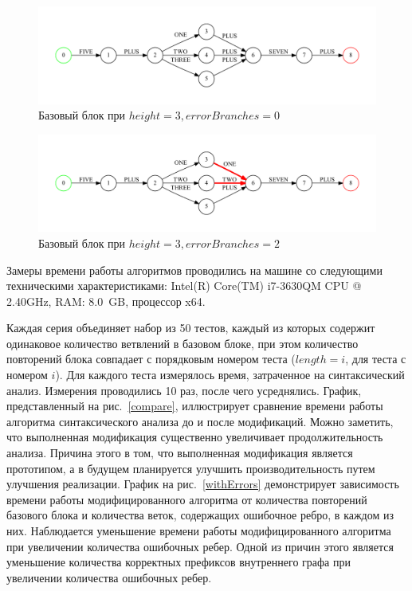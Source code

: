 \begin{figure}[h!]
 \centering
 \includegraphics[width=15cm]{pictures/block.pdf}
 \caption{Базовый блок при $height=3, errorBranches=0$}
 \label{block}
\end{figure}

\begin{figure}[h!]
 \centering
 \includegraphics[width=15cm]{pictures/errorBlock.pdf}
 \caption{Базовый блок при $height=3, errorBranches=2$}
 \label{errorBlock}
\end{figure}

Замеры времени работы алгоритмов проводились на машине со следующими техническими характеристиками: Intel(R) Core(TM) i7-3630QM CPU @ 2.40GHz, RAM: 8.0~GB, процессор x64.

Каждая серия объединяет набор из 50 тестов, каждый из которых содержит одинаковое количество ветвлений в базовом блоке, при этом количество повторений блока совпадает с порядковым номером теста ($length = i$, для теста с номером $i$). Для каждого теста измерялось время, затраченное на синтаксический анализ. Измерения проводились 10 раз, после чего усреднялись. График, представленный на рис.~\ref{compare}, иллюстрирует сравнение времени работы алгоритма синтаксического анализа до и после модификаций. Можно заметить, что выполненная модификация существенно увеличивает продолжительность анализа. Причина этого в том, что выполненная модификация является прототипом, а в будущем планируется улучшить производительность путем улучшения реализации. График на рис.~\ref{withErrors} демонстрирует зависимость времени работы модифицированного алгоритма от количества повторений базового блока и количества веток, содержащих ошибочное ребро, в каждом из них. Наблюдается уменьшение времени работы модифицированного алгоритма при увеличении количества ошибочных ребер. Одной из причин этого является уменьшение количества корректных префиксов внутреннего графа при увеличении количества ошибочных ребер.

